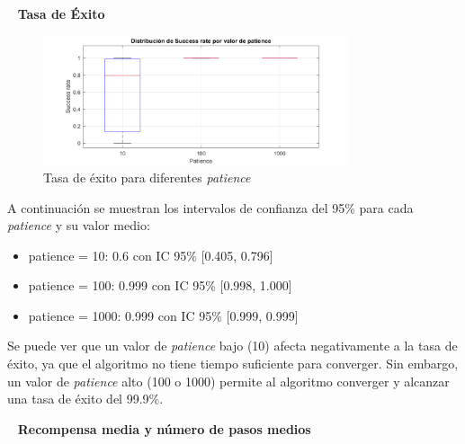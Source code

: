 \
\newpage
\textbf{Tasa de Éxito}

\begin{figure}[H]
    \centering
    \includegraphics[width=0.8\textwidth]{../../experiments/directEstimation/experiment-3/results/success.png}
    \caption{Tasa de éxito para diferentes \textit{patience}}
    \label{fig:directEstimation3-success}
\end{figure}

A continuación se muestran los intervalos de confianza del 95\% para cada \textit{patience} y su valor medio:
\begin{itemize}
    \item patience = 10: 0.6 con IC 95\% [0.405,  0.796]
    \item patience = 100: 0.999 con IC 95\% [0.998,  1.000]
    \item patience = 1000: 0.999 con IC 95\% [0.999,  0.999]
\end{itemize}

Se puede ver que un valor de \textit{patience} bajo (10) afecta negativamente a la tasa de éxito, ya que el algoritmo no tiene tiempo suficiente para converger. Sin embargo, un valor de \textit{patience} alto (100 o 1000) permite al algoritmo converger y alcanzar una tasa de éxito del 99.9\%.

\
\newpage
\textbf{Recompensa media y número de pasos medios}


